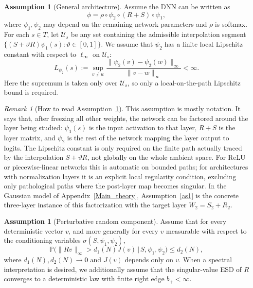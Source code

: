 \documentclass[11pt]{article}
\theoremstyle{plain}
\theoremstyle{definition}
\newtheorem{assumption}[thm]{Assumption}
\theoremstyle{remark}
\newtheorem{rem}[thm]{Remark}
\newcommand{\PP}{\mathbb{P}}
\newcommand{\1}{\mathbf{1}}
\begin{document}
\begin{assumption}[General architecture]
\label{as4}
Assume the DNN can be written as
\[
\phi=\rho\circ \psi_2\circ (R+S)\circ \psi_1,
\]
where \(\psi_1,\psi_2\) may depend on the remaining network parameters and \(\rho\) is softmax. For each \(s\in T\), let \(\mathcal U_s\) be any set containing the admissible interpolation segment \(\{(S+\vartheta R)\psi_1(s):\vartheta\in[0,1]\}\). We assume that \(\psi_2\) has a finite local Lipschitz constant with respect to \(\ell_\infty\) on \(\mathcal U_s\):
\[
L_{\psi_2}(s)
:=
\sup_{v\neq w}
\frac{\|\psi_2(v)-\psi_2(w)\|_{\infty}}{\|v-w\|_{\infty}}
<\infty.
\]
Here the supremum is taken only over \(\mathcal U_s\), so only a local-on-the-path Lipschitz bound is required.
\end{assumption}

\begin{rem}[How to read Assumption~\ref{as4}]
This assumption is mostly notation.  It says that, after freezing all other weights, the network can be factored around the layer being studied: \(\psi_1(s)\) is the input activation to that layer, \(R+S\) is the layer matrix, and \(\psi_2\) is the rest of the network mapping the layer output to logits.  The Lipschitz constant is only required on the finite path actually traced by the interpolation \(S+\vartheta R\), not globally on the whole ambient space.  For ReLU or piecewise-linear networks this is automatic on bounded paths; for architectures with normalization layers it is an explicit local regularity condition, excluding only pathological paths where the post-layer map becomes singular.  In the Gaussian model of Appendix~\ref{Main_theory}, Assumption~\ref{as1} is the concrete three-layer instance of this factorization with the target layer \(W_2=S_2+R_2\).
\end{rem}

\begin{assumption}[Perturbative random component]
\label{as5}
Assume that for every deterministic vector \(v\), and more generally for every \(v\) measurable with respect to the conditioning variables \(\sigma(S,\psi_1,\psi_2)\),
\begin{equation}
\label{eq:general_perturb_assumption}
\PP\Big(\|Rv\|_{\infty}>d_1(N)J(v)\,\Big|\,S,\psi_1,\psi_2\Big)\le d_2(N),
\end{equation}
where \(d_1(N),d_2(N)\to0\) and \(J(v)\) depends only on \(v\). When a spectral interpretation is desired, we additionally assume that the singular-value ESD of \(R\) converges to a deterministic law with finite right edge \(b_+<\infty\).
\end{assumption}
\end{document}
